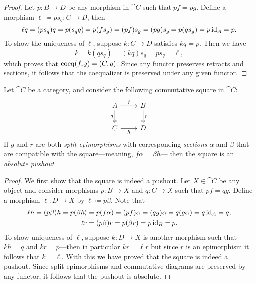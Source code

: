 \begin{proof}
    Let \(p: B \to D\) be any morphism in \(\cat C\) such that \(p f = p g\). Define
    a morphism \(\ell \coloneq p s_q: C \to D\), then
    \[
        \ell q = (p s_q) q
        = p (s_q q)
        = p (f s_g)
        = (p f) s_g
        = (p g) s_g
        = p (g s_g)
        = p \operatorname{id}_A
        = p.
    \]
    To show the uniqueness of \(\ell\), suppose \(k: C \to D\) satisfies \(k q =
    p\). Then we have
    \[
        k = k (q s_q)
        = (k q) s_q
        = p s_q
        = \ell,
    \]
    which proves that \(\operatorname{coeq}(f, g) = (C, q)\). Since any functor preserves retracts
    and sections, it follows that the coequalizer is preserved under any given
    functor.
\end{proof}

\begin{proposition}
    \label{prop:absolute-pushout}
    Let \(\cat C\) be a category, and consider the following commutative square in
    \(\cat C\):
    \[
        \begin{tikzcd}
            A \ar[r, "f"] \ar[d, two heads, "g"']
            &B \ar[d, two heads,"r"] \\
            C \ar[r, "h"'] &D
        \end{tikzcd}
    \]
    If \(g\) and \(r\) are both \emph{split epimorphisms} with corresponding
    \emph{sections} \(\alpha\) and \(\beta\) that are compatible with the
    square---meaning, \(f \alpha = \beta h\)--- then the square is an \emph{absolute
        pushout}.
\end{proposition}

\begin{proof}
    We first show that the square is indeed a pushout. Let \(X \in \cat C\) be any
    object and consider morphisms \(p: B \to X\) and \(q: C \to X\) such that
    \(p f = q g\). Define a morphism \(\ell: D \to X\) by \(\ell \coloneq p
    \beta\). Note that
    \begin{gather*}
        \ell h = (p \beta) h = p (\beta h) = p (f \alpha) = (p f) \alpha
        = (q g) \alpha = q (g \alpha) = q \operatorname{id}_A = q, \\
        \ell r = (p \beta) r = p (\beta r) = p \operatorname{id}_B = p.
    \end{gather*}
    To show uniqueness of \(\ell\), suppose \(k: D \to X\) is another morphism such
    that \(k h = q\) and \(k r = p\)---then in particular \(k r = \ell r\) but since
    \(r\) is an epimorphism it follows that \(k = \ell\). With this we have proved
    that the square is indeed a pushout. Since split epimorphisms and commutative
    diagrams are preserved by any functor, it follows that the pushout is absolute.
\end{proof}
